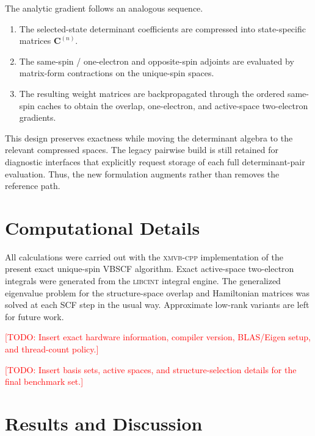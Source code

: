\documentclass[journal=jctcce,manuscript=article]{achemso}
\newcommand{\Cmat}{\mathbf{C}}
\newcommand{\todo}[1]{\textcolor{red}{[TODO: #1]}}
\begin{document}
The analytic gradient follows an analogous sequence.
\begin{enumerate}
  \item The selected-state determinant coefficients are compressed into
        state-specific matrices $\Cmat^{(n)}$.
  \item The same-spin / one-electron and opposite-spin adjoints are evaluated
        by matrix-form contractions on the unique-spin spaces.
  \item The resulting weight matrices are backpropagated through the ordered
        same-spin caches to obtain the overlap, one-electron, and active-space
        two-electron gradients.
\end{enumerate}

This design preserves exactness while moving the determinant algebra to the
relevant compressed spaces. The legacy pairwise build is still retained for
diagnostic interfaces that explicitly request storage of each full
determinant-pair evaluation. Thus, the new formulation augments rather than
removes the reference path.

\section{Computational Details}
All calculations were carried out with the \textsc{xmvb-cpp} implementation of
the present exact unique-spin VBSCF algorithm. Exact active-space two-electron
integrals were generated from the \textsc{libcint} integral engine. The
generalized eigenvalue problem for the structure-space overlap and Hamiltonian
matrices was solved at each SCF step in the usual way. Approximate low-rank
variants are left for future work.

\todo{Insert exact hardware information, compiler version, BLAS/Eigen setup,
and thread-count policy.}

\todo{Insert basis sets, active spaces, and structure-selection details for the
final benchmark set.}

\section{Results and Discussion}
\end{document}
